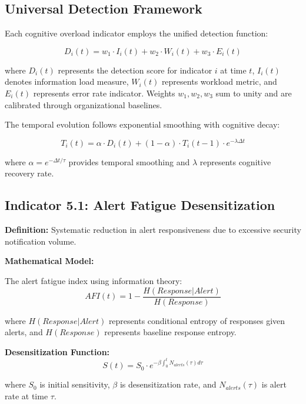 \documentclass[11pt,a4paper]{article}
\begin{document}
\subsection{Universal Detection Framework}

Each cognitive overload indicator employs the unified detection function:

\begin{equation}
D_i(t) = w_1 \cdot I_i(t) + w_2 \cdot W_i(t) + w_3 \cdot E_i(t)
\end{equation}

where $D_i(t)$ represents the detection score for indicator $i$ at time $t$, $I_i(t)$ denotes information load measure, $W_i(t)$ represents workload metric, and $E_i(t)$ represents error rate indicator. Weights $w_1, w_2, w_3$ sum to unity and are calibrated through organizational baselines.

The temporal evolution follows exponential smoothing with cognitive decay:

\begin{equation}
T_i(t) = \alpha \cdot D_i(t) + (1-\alpha) \cdot T_i(t-1) \cdot e^{-\lambda \Delta t}
\end{equation}

where $\alpha = e^{-\Delta t/\tau}$ provides temporal smoothing and $\lambda$ represents cognitive recovery rate.

\subsection{Indicator 5.1: Alert Fatigue Desensitization}

\textbf{Definition:} Systematic reduction in alert responsiveness due to excessive security notification volume.

\textbf{Mathematical Model:}

The alert fatigue index using information theory:
\begin{equation}
AFI(t) = 1 - \frac{H(Response|Alert)}{H(Response)}
\end{equation}

where $H(Response|Alert)$ represents conditional entropy of responses given alerts, and $H(Response)$ represents baseline response entropy.

\textbf{Desensitization Function:}
\begin{equation}
S(t) = S_0 \cdot e^{-\beta \int_0^t N_{alerts}(\tau) d\tau}
\end{equation}

where $S_0$ is initial sensitivity, $\beta$ is desensitization rate, and $N_{alerts}(\tau)$ is alert rate at time $\tau$.
\end{document}
